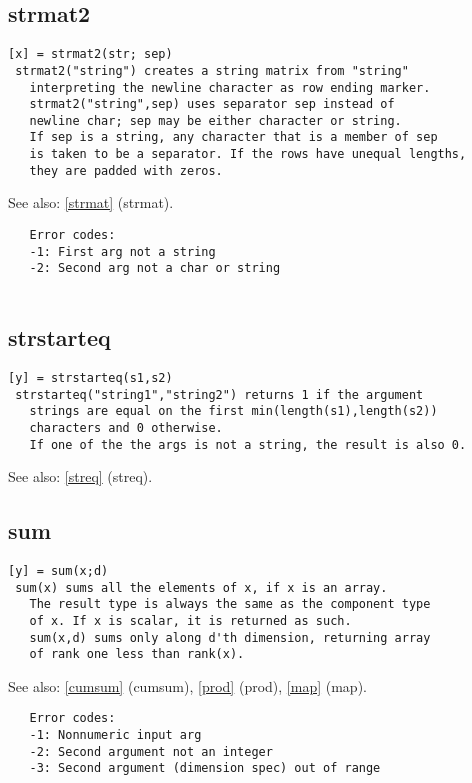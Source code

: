 \documentclass[a4paper]{article}
\begin{document}
\subsection{strmat2\label{strmat2}}

\begin{tscreen}
\begin{verbatim}
[x] = strmat2(str; sep)
 strmat2("string") creates a string matrix from "string"
   interpreting the newline character as row ending marker.
   strmat2("string",sep) uses separator sep instead of
   newline char; sep may be either character or string.
   If sep is a string, any character that is a member of sep
   is taken to be a separator. If the rows have unequal lengths,
   they are padded with zeros.
\end{verbatim}

See also: \ref{strmat} {(strmat)}.
\begin{verbatim}
   Error codes:
   -1: First arg not a string
   -2: Second arg not a char or string
   
\end{verbatim}
\end{tscreen}



\subsection{strstarteq\label{strstarteq}}

\begin{tscreen}
\begin{verbatim}
[y] = strstarteq(s1,s2)
 strstarteq("string1","string2") returns 1 if the argument
   strings are equal on the first min(length(s1),length(s2))
   characters and 0 otherwise.
   If one of the the args is not a string, the result is also 0.
\end{verbatim}

See also: \ref{streq} {(streq)}.
\end{tscreen}



\subsection{sum\label{sum}}

\begin{tscreen}
\begin{verbatim}
[y] = sum(x;d)
 sum(x) sums all the elements of x, if x is an array.
   The result type is always the same as the component type
   of x. If x is scalar, it is returned as such.
   sum(x,d) sums only along d'th dimension, returning array
   of rank one less than rank(x).
\end{verbatim}

See also: \ref{cumsum} {(cumsum)}, \ref{prod} {(prod)}, \ref{map} {(map)}.
\begin{verbatim}
   Error codes:
   -1: Nonnumeric input arg
   -2: Second argument not an integer
   -3: Second argument (dimension spec) out of range 
\end{verbatim}
\end{tscreen}
\end{document}
